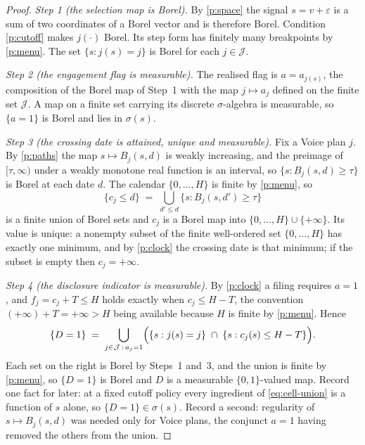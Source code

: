\begin{proof}
\emph{Step 1 (the selection map is Borel).} By \ref{p:space} the signal $s = v + \varepsilon$ is a
sum of two coordinates of a Borel vector and is therefore Borel. Condition \ref{p:cutoff} makes
$j(\cdot)$ Borel. Its step form has finitely many breakpoints by \ref{p:menu}. The set
$\{s : j(s) = j\}$ is Borel for each
$j \in \mathcal J$.

\emph{Step 2 (the engagement flag is measurable).} The realised flag is $a = a_{j(s)}$, the
composition of the Borel map of Step~1 with the map $j \mapsto a_j$ defined on the finite set
$\mathcal J$. A map on a finite set carrying its discrete $\sigma$-algebra is measurable, so
$\{a = 1\}$ is Borel and lies in $\sigma(s)$.

\emph{Step 3 (the crossing date is attained, unique and measurable).} Fix a Voice plan $j$. By
\ref{p:paths} the map $s \mapsto B_j(s,d)$ is weakly increasing, and the preimage of
$[\tau,\infty)$ under a weakly monotone real function is an interval, so
$\{s : B_j(s,d) \ge \tau\}$ is Borel at each date $d$. The calendar $\{0,\dots,H\}$ is finite by
\ref{p:menu}, so
\[
  \{c_j \le d\} \;=\; \bigcup_{d' \le d}\{s : B_j(s,d') \ge \tau\}
\]
is a finite union of Borel sets and $c_j$ is a Borel map into $\{0,\dots,H\} \cup \{+\infty\}$. Its
value is unique: a nonempty subset of the finite well-ordered set $\{0,\dots,H\}$ has exactly one
minimum, and by \ref{p:clock} the crossing date is that minimum; if the subset is empty then
$c_j = +\infty$.

\emph{Step 4 (the disclosure indicator is measurable).} By \ref{p:clock} a filing requires
$a = 1$, and $f_j = c_j + T \le H$ holds exactly when $c_j \le H - T$, the convention
$(+\infty) + T = +\infty > H$ being available because $H$ is finite by \ref{p:menu}. Hence
\begin{equation}
\label{eq:cell-union}
  \{D = 1\} \;=\; \bigcup_{j \in \mathcal J\,:\,a_j = 1}
    \Bigl( \{s : j(s) = j\} \;\cap\; \{s : c_j(s) \le H - T\} \Bigr).
\end{equation}
Each set on the right is Borel by Steps~1 and~3, and the union is finite by \ref{p:menu}, so
$\{D = 1\}$ is Borel and $D$ is a measurable $\{0,1\}$-valued map. Record one fact for later: at a
fixed cutoff policy every ingredient of \eqref{eq:cell-union} is a function of $s$ alone, so
$\{D = 1\} \in \sigma(s)$. Record a second: regularity of $s \mapsto B_j(s,d)$ was needed only for
Voice plans, the conjunct $a = 1$ having removed the others from the union.


\end{proof}
